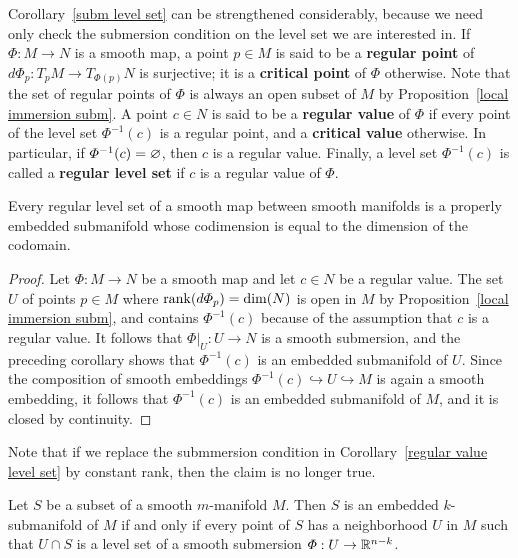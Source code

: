 Corollary~\ref{subm level set} can be strengthened considerably, because we need only check the submersion condition on the level set we are interested in. If $\varPhi:M\to N$ is a smooth map, a point $p\in M$ is said to be a \textbf{regular point} of $d\varPhi_p:T_pM\to T_{\varPhi(p)}N$ is surjective; it is a \textbf{critical point} of $\varPhi$ otherwise. Note that the set of regular points of $\varPhi$ is always an open subset of $M$ by Proposition~\ref{local immersion subm}. A point $c\in N$ is said to be a \textbf{regular value} of $\varPhi$ if every point of the level set $\varPhi^{-1}(c)$ is a regular point, and a \textbf{critical value} otherwise. In particular, if $\varPhi^{-1}(c)=\varnothing$, then $c$ is a regular value. Finally, a level set $\varPhi^{-1}(c)$ is called a \textbf{regular level set} if $c$ is a regular value of $\varPhi$.
\begin{corollary}\label{regular value level set}
Every regular level set of a smooth map between smooth manifolds is a properly embedded submanifold whose codimension is equal to the dimension of the codomain.
\end{corollary}
\begin{proof}
Let $\varPhi:M\to N$ be a smooth map and let $c\in N$ be a regular value. The set $U$ of points $p\in M$ where $\mathrm{rank}(d\varPhi_p)=\dim(N)$ is open in $M$ by Proposition~\ref{local immersion subm}, and contains $\varPhi^{-1}(c)$ because of the assumption that $c$ is a regular value. It follows that $\varPhi|_U:U\to N$ is a smooth submersion, and the preceding corollary shows that $\varPhi^{-1}(c)$ is an embedded submanifold of $U$. Since the composition of smooth embeddings $\varPhi^{-1}(c)\hookrightarrow U\hookrightarrow M$ is again a smooth embedding, it follows that $\varPhi^{-1}(c)$ is an embedded submanifold of $M$, and it is closed by continuity.
\end{proof}
\begin{remark}
Note that if we replace the submmersion condition in Corollary~\ref{regular value level set} by constant rank, then the claim is no longer true.
\end{remark}
\begin{proposition}\label{embedd mani iff level set}
Let $S$ be a subset of a smooth $m$-manifold $M$. Then $S$ is an embedded $k$-submanifold of $M$ if and only if every point of $S$ has a neighborhood $U$ in $M$ such that $U\cap S$ is a level set of a smooth submersion $\varPhi:U\to\mathbb{R}^{n-k}$.
\end{proposition}
